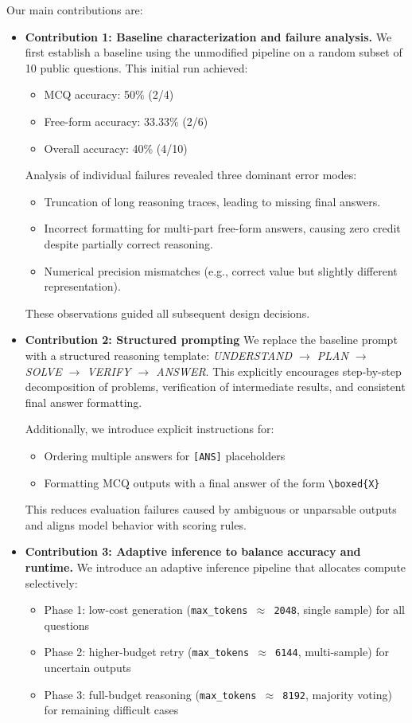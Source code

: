 \documentclass{article}
\begin{document}
Our main contributions are:
\begin{itemize}
  \item \textbf{Contribution 1: Baseline characterization and failure analysis.}
We first establish a baseline using the unmodified pipeline on a random subset of 10 public questions. This initial run achieved:
\begin{itemize}
    \item MCQ accuracy: 50\% (2/4)
    \item Free-form accuracy: 33.33\% (2/6)
    \item Overall accuracy: 40\% (4/10)
\end{itemize}

Analysis of individual failures revealed three dominant error modes:
\begin{itemize}
    \item Truncation of long reasoning traces, leading to missing final answers.
    \item Incorrect formatting for multi-part free-form answers, causing zero credit despite partially correct reasoning.
    \item Numerical precision mismatches (e.g., correct value but slightly different representation).
\end{itemize}

These observations guided all subsequent design decisions.

\item \textbf{Contribution 2: Structured prompting}
We replace the baseline prompt with a structured reasoning template:
\textit{UNDERSTAND $\rightarrow$ PLAN $\rightarrow$ SOLVE $\rightarrow$ VERIFY $\rightarrow$ ANSWER}.
This explicitly encourages step-by-step decomposition of problems, verification of intermediate results, and consistent final answer formatting.

Additionally, we introduce explicit instructions for:
\begin{itemize}
    \item Ordering multiple answers for \texttt{[ANS]} placeholders
    \item Formatting MCQ outputs with a final answer of the form \texttt{\textbackslash boxed\{X\}}
\end{itemize}

This reduces evaluation failures caused by ambiguous or unparsable outputs and aligns model behavior with scoring rules.

\item \textbf{Contribution 3: Adaptive inference to balance accuracy and runtime.}
We introduce an adaptive inference pipeline \cite{snell2024scaling} that allocates compute selectively:
\begin{itemize}
    \item Phase 1: low-cost generation (\texttt{max\_tokens $\approx$ 2048}, single sample) for all questions
    \item Phase 2: higher-budget retry (\texttt{max\_tokens $\approx$ 6144}, multi-sample) for uncertain outputs
    \item Phase 3: full-budget reasoning (\texttt{max\_tokens $\approx$ 8192}, majority voting) for remaining difficult cases
\end{itemize}


\end{itemize}
\end{document}

